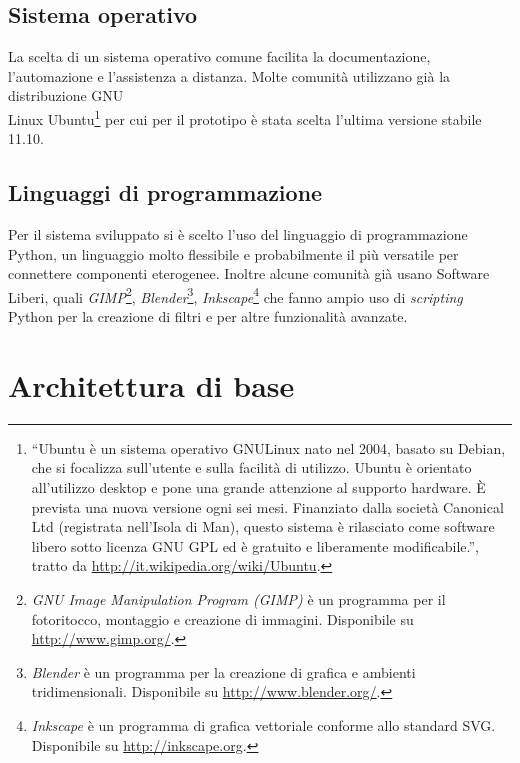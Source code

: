 \subsection{Sistema operativo}
La scelta di un sistema operativo comune facilita la documentazione,
l'automazione e l'assistenza a distanza. Molte comunità utilizzano già
la distribuzione GNU\\Linux Ubuntu\footnote{``Ubuntu è un sistema
  operativo GNU\/Linux nato nel 2004, basato su Debian, che si
  focalizza sull'utente e sulla facilità di utilizzo. Ubuntu è
  orientato all'utilizzo desktop e pone una grande attenzione al
  supporto hardware. È prevista una nuova versione ogni sei mesi.
  Finanziato dalla società Canonical Ltd (registrata nell'Isola di
  Man), questo sistema è rilasciato come software libero sotto licenza
  GNU GPL ed è gratuito e liberamente modificabile.'', tratto da
  \url{http://it.wikipedia.org/wiki/Ubuntu}.} per cui per il prototipo
è stata scelta l'ultima versione stabile 11.10.

\subsection{Linguaggi di programmazione}
Per il sistema sviluppato si è scelto l'uso del linguaggio di
programmazione Python, un linguaggio molto flessibile e probabilmente
il più versatile per connettere componenti eterogenee. Inoltre alcune
comunità già usano Software Liberi, quali
\emph{GIMP}\footnote{\emph{GNU Image Manipulation Program (GIMP)} è un
  programma per il fotoritocco, montaggio e creazione di
  immagini. Disponibile su \url{http://www.gimp.org/}.},
\emph{Blender}\footnote{\emph{Blender} è un programma per la creazione
  di grafica e ambienti tridimensionali. Disponibile su
  \url{http://www.blender.org/}.},
\emph{Inkscape}\footnote{\emph{Inkscape} è un programma di grafica
  vettoriale conforme allo standard SVG. Disponibile su
  \url{http://inkscape.org}.} che fanno ampio uso di \emph{scripting}
Python per la creazione di filtri e per altre funzionalità avanzate.


\section{Architettura di base}

